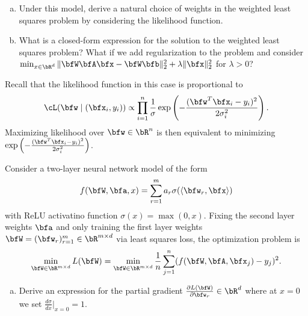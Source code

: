 \begin{homework}[e]
  \begin{enumerate}[(a)]
    \item Under this model, derive a natural choice of weights in the weighted least squares problem by considering the likelihood function.
    \item What is a closed-form expression for the solution to the weighted least squares problem? What if we add regularization to the problem and consider $\min_{x\in \bR^d}\|\bfW\bfA\bfx - \bfW\bfb\|^2_2 + \lambda\|\bfx\|^2_2$ for $\lambda > 0$?
  \end{enumerate}
  \begin{prf}
    Recall that the likelihood function in this case is proportional to
    \begin{align*}
      \cL(\bfw \mid (\bfx_i,y_i)) \propto \prod_{i=1}^n \frac{1}{\sigma}\exp\left(-\frac{(\bfw^T\bfx_i - y_i)^2}{2\sigma_i^2}\right).
    \end{align*}
    Maximizing likelihood over $\bfw \in \bR^n$ is then equivalent to minimizing $\exp\left(-\frac{(\bfw^T\bfx_i - y_i)^2}{2\sigma_i^2}\right)$.
  \end{prf}

   Consider a two-layer neural network model of the form
  \begin{align*}
    f(\bfW, \bfa, x) = \sum_{r=1}^m a_r \sigma(\langle \bfw_r, \bfx \rangle)
  \end{align*}
  with ReLU activatino function $\sigma(x) = \max(0,x)$. Fixing the second layer weights $\bfa$ and only training the first layer weights $\bfW = (\bfw_r)^{m}_{r=1} \in \bR^{m\times d}$ via least squares loss, the optimization problem is
  \begin{align*}
    \min_{\bfW\in \bR^{m\times d}} L(\bfW) = \min_{\bfW\in \bR^{m\times d}} \frac{1}{n}\sum_{j=1}^n (f(\bfW, \bfA, \bfx_j) - y_j)^2.
  \end{align*}
  \begin{enumerate}[(a)]
    \item Derive an expression for the partial gradient $\frac{\partial L(\bfW)}{\partial \bfw_r} \in \bR^d$ where at $x = 0$ we set $\frac{d\sigma}{dx}\Big|_{x=0} = 1$.
  \end{enumerate}


\end{homework}
